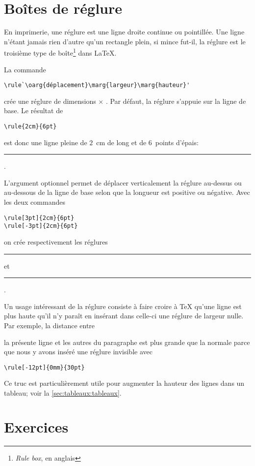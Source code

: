 \section{Boîtes de réglure}
\label{sec:boites:rulebox}

En imprimerie, une réglure est une ligne droite continue ou
pointillée. Une ligne n'étant jamais rien d'autre qu'un rectangle
plein, si mince fut-il, la réglure est le troisième type de
boîte\footnote{%
  \emph{Rule box}, en anglais} %
dans {\LaTeX}.

La commande
\begin{lstlisting}
\rule`\oarg{déplacement}\marg{largeur}\marg{hauteur}'
\end{lstlisting}
crée une réglure de dimensions  $\times$ .
Par défaut, la réglure s'appuie sur la ligne de base. Le résultat de
\begin{lstlisting}
\rule{2cm}{6pt}
\end{lstlisting}
est donc une ligne pleine de $2$~cm de long et de $6$~points d'épais:
\rule{2cm}{6pt}.

L'argument optionnel  permet de déplacer
verticalement la réglure au-dessus ou au-dessous de la ligne de base
selon que la longueur  est positive ou négative. Avec les deux
commandes
\begin{lstlisting}
\rule[3pt]{2cm}{6pt}
\rule[-3pt]{2cm}{6pt}
\end{lstlisting}
on crée respectivement les réglures \rule[3pt]{2cm}{6pt} et
\rule[-3pt]{2cm}{6pt}.

Un usage intéressant de la réglure consiste à faire croire à {\TeX}
qu'une ligne est plus haute qu'il n'y paraît en insérant dans celle-ci
une réglure de largeur nulle. Par exemple, la distance entre
\rule[-12pt]{0mm}{30pt}\relax la présente ligne et les autres du paragraphe est
plus grande que la normale parce que nous y avons inséré une réglure
invisible avec
\begin{lstlisting}
\rule[-12pt]{0mm}{30pt}
\end{lstlisting}
Ce truc est particulièrement utile pour augmenter la hauteur des
lignes dans un tableau; voir la \autoref{sec:tableaux:tableaux}.




\section{Exercices}
\label{sec:boites:exercices}

